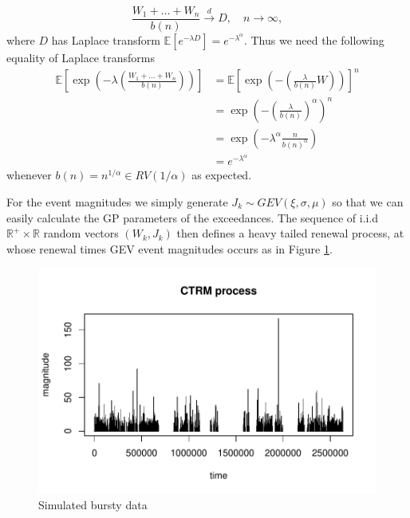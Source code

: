 \documentclass[honours,12pt,twoside, openright]{unswthesis}
\newcommand{\E}{\mathbb{E}}
\newcommand{\1}{\mathbf 1}
\numberwithin{equation}{section}
\theoremstyle{definition}
\theoremstyle{remark}
\begin{document}
\[
	\frac{W_1 + \ldots + W_n}{b(n)} \overset{d}{\longrightarrow} D, \quad n \to \infty,
\]
where $D$ has Laplace transform $\E[e^{-\lambda D}] = e^{- \lambda^\alpha}$. Thus we need the following equality of Laplace transforms
\begin{align*}
	\E\left[\exp\left(-\lambda\left(\frac{W_1+\ldots+W_n}{b(n)}\right)\right)\right]&=\E\left[\exp\left(-\left(\frac{\lambda}{b(n)}W\right)\right)\right]^n\\
	&=\exp\left(-\left(\frac{\lambda}{b(n)}\right)^\alpha\right)^n\\
	&=\exp\left(-\lambda^\alpha\frac{n}{b(n)^\alpha}\right)\\
	&=e^{- \lambda^\alpha}
\end{align*}
whenever $b(n)=n^{1/\alpha}\in RV(1/\alpha)$ as expected.

For the event magnitudes we simply generate $J_k\sim GEV(\xi,\sigma,\mu)$ so that we can easily calculate the GP parameters of the exceedances. The sequence of i.i.d $\mathbb{R}^+\times\mathbb{R}$ random vectors $(W_k,J_k)$ then defines a heavy tailed renewal process, at whose renewal times GEV event magnitudes occurs as in Figure \ref{fig:bursty}.
	
	\begin{figure}[h]
        \centering
        \caption{Simulated bursty data}\label{fig:bursty}
        \includegraphics[width=\textwidth]{Figures/unitCTRMprocessNoTitle.pdf}
    \end{figure}
\end{document}
